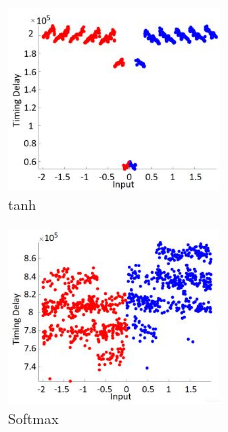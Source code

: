 \begin{figure}
    \centering
    \includegraphics[width=0.5\textwidth]{images/chapter8/activ-tanh-c.JPG}
    \caption{tanh}
    \label{fig:activ-tanh}
\end{figure}

\begin{figure}
    \centering
    \includegraphics[width=0.5\textwidth]{images/chapter8/activ-softmax-d.JPG}
    \caption{Softmax}
    \label{fig:activ-softmax}
\end{figure}

